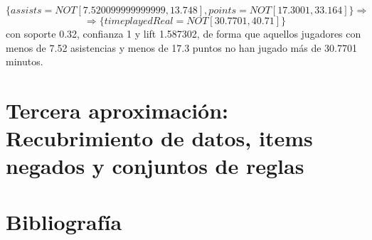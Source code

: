 $$\{assists= NOT[7.520099999999999, 13.748],                                                                                                                                                                      
points= NOT [17.3001, 33.164]\} \Rightarrow$$ $$\Rightarrow \{timeplayedReal= NOT [30.7701, 40.71]\}$$
con soporte 0.32, confianza 1 y lift 1.587302, de forma que aquellos jugadores con menos de 7.52 asistencias y menos de 17.3 puntos no han jugado más de 30.7701 minutos. 

\section{Tercera aproximación: Recubrimiento de datos, items negados y conjuntos de reglas}


\newpage
\section{Bibliografía}




